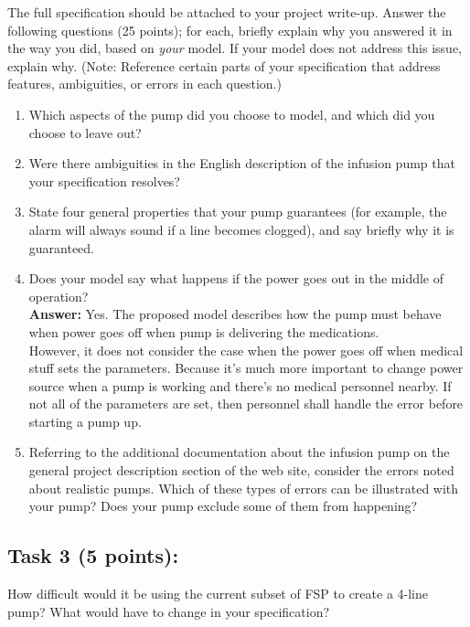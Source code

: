 \documentclass{article}
\newcommand{\head}{\subsection*}
\begin{document}
\noindent The full specification should be attached to your project
write-up. Answer the following questions (25 points); for each,
briefly explain why you answered it in the way you did, based on
\emph{your} model. If your model does not address this issue,
explain why. (Note: Reference certain parts of your specification that address features, ambiguities, or errors in each question.)

\begin{enumerate}
    \item Which aspects of the pump did you choose to model, and which did you choose to leave out?
    \item Were there ambiguities in the English description of the infusion pump that your specification resolves?
    \item State four general properties that your pump guarantees (for example, the alarm will always sound if a line becomes clogged), and say briefly why it is guaranteed.
    \item Does your model say what happens if the power goes out in the middle of operation? 
    \\
    \textbf{Answer:} Yes. The proposed model describes how the pump must behave when power goes off when pump is delivering the medications. 
    \\However, it does not consider the case when the power goes off when medical stuff sets the parameters. Because it's much more important to change power source when a pump is working and there's no medical personnel nearby. If not all of the parameters are set, then personnel shall handle the error before starting a pump up. 
    \item Referring to the additional documentation about the infusion pump on the general project description section of the web site, consider the errors noted about realistic pumps. Which of these types of errors can be illustrated with your pump? Does your pump exclude some of them from happening?

\end{enumerate}


\head{Task 3 (5 points):}


How difficult would it be using the current subset of FSP to create
a 4-line pump? What would have to change in your specification?\\
\end{document}
